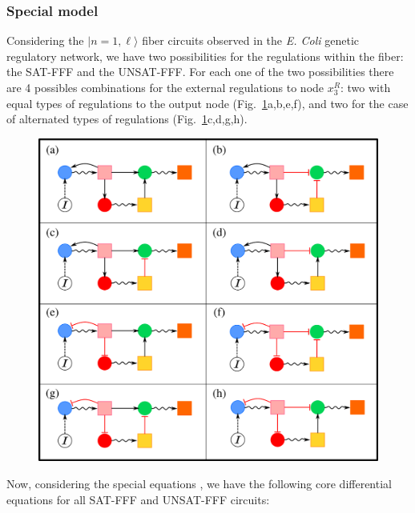 \subsubsection{Special model}

Considering the $| n=1, \ell \rangle$ fiber circuits observed in 
the \textit{E. Coli} genetic regulatory network, we have two 
possibilities for the regulations within the fiber: the SAT-FFF 
and the UNSAT-FFF. For each one of the two 
possibilities there are 4 possibles combinations for the external
regulations to node $x_3^R$: two with equal 
types of regulations to the output node (Fig.~\ref{fig:combination_n1}a,b,e,f), 
and two for the case of alternated types of regulations
(Fig.~\ref{fig:combination_n1}c,d,g,h). 

\begin{figure}[H]
    \centering
    \includegraphics[scale=0.6]{figs/broken_n1_mosaic.png}
    \caption{}
    \label{fig:combination_n1}
\end{figure}

Now, considering the special equations \cite{stochs_gene_2005,homeostasis_antonelli2018}, we have the following core differential 
equations for all SAT-FFF and UNSAT-FFF circuits:

